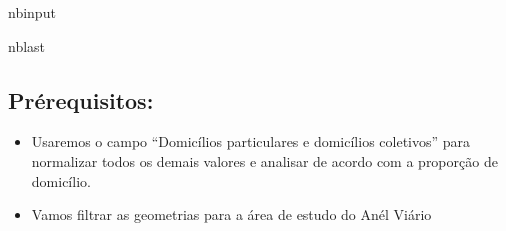\documentclass[letterpaper,10pt,brazil]{sphinxmanual}
\begin{document}
\begin{sphinxuseclass}{nbinput}
\begin{sphinxuseclass}{nblast}
{
\begin{sphinxVerbatim}[commandchars=\\\{\}]
\llap{\color{nbsphinxin}[1]:\,\hspace{\fboxrule}\hspace{\fboxsep}} 
 

 
   
\end{sphinxVerbatim}
}

\end{sphinxuseclass}
\end{sphinxuseclass}

\subsection{Pré\sphinxhyphen{}requisitos:}
\label{\detokenize{exemplos/analise_domicilios:Pr_xe9-requisitos:}}\begin{itemize}
\item {} 
\sphinxAtStartPar
Usaremos o campo “Domicílios particulares e domicílios coletivos” para normalizar todos os demais valores e analisar de acordo com a proporção de domicílio.

\item {} 
\sphinxAtStartPar
Vamos filtrar as geometrias para a área de estudo do Anél Viário

\end{itemize}
\end{document}
